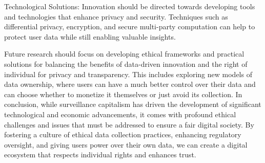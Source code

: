 Technological Solutions: Innovation should be directed towards developing tools and technologies that enhance privacy and security.
Techniques such as differential privacy, encryption, and secure multi-party computation can help to protect user data while still enabling valuable insights.

Future research should focus on developing ethical frameworks and practical solutions for balancing the benefits of data-driven innovation and the right of individual for privacy and transparency.
This includes exploring new models of data ownership, where users can have a much better control over their data and can choose whether to monetize it themselves or just avoid its collection.
In conclusion, while surveillance capitalism has driven the development of significant technological and economic advancements, it comes with profound ethical challenges and issues that must be addressed to ensure a fair digital society.
By fostering a culture of ethical data collection practices, enhancing regulatory oversight, and giving users power over their own data, we can create a digital ecosystem that respects individual rights and enhances trust.
\noindent
